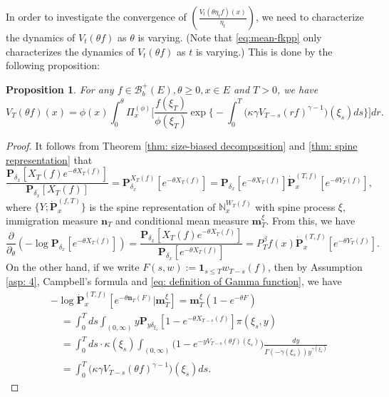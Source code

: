 \documentclass[12pt, a4paper]{amsart}
\newtheorem{prop}[thm]{Proposition}
\theoremstyle{definition}
\numberwithin{equation}{section}
\begin{document}
	In order to investigate the convergence of $(\frac{ V_t(\theta \eta_t f)(x)}{\eta_t})$, we need to characterize the dynamics of $V_t(\theta f)$ as $\theta$ is varying.
	(Note that \eqref{eq:mean-fkpp} only characterizes the dynamics of $V_t(\theta f)$ as $t$ is varying.)
	This is done by the following proposition:

\begin{prop}
	For any $f\in \mathscr B^+_b(E),\theta \geq 0,x\in E$ and $T>0$, we have
\[\label{eq: equation for Vt(theta f) for theta}
	V_T ( \theta f) ( x)
	= \phi( x) \int_0^\theta \Pi_x^{(\phi)} \Big[ \frac{ f(\xi_T) } { \phi(\xi_T) } \exp\Big\{ - \int_0^T \big( \kappa \gamma V_{T-s} (r f)^{ \gamma - 1} \big) ( \xi_s) ds\Big\} \Big] dr.
\]
\end{prop}

\begin{proof}
	It follows from Theorem \ref{thm: size-biased decomposition} and \ref{thm: spine representation} that
\[
	\frac{ \mathbf P_{\delta_x}[X_T(f)e^{-\theta X_T(f)}] } {  \mathbf P_{\delta_x} [X_T(f)] }
	= \mathbf P_{\delta_x}^{X_T(f)} [e^{-\theta X_T(f)}]
	= \mathbf P_{\delta_x} [e^{-\theta X_T(f)}] \dot {\mathbf P}_x^{(T,f)}[e^{-\theta Y_T(f)}],
\]
	where $\{Y; \dot {\mathbf P}^{(f,T)}_x\}$ is the spine representation of $\mathbb N^{W_T(f)}_x$ with spine process $\xi$,
immigration measure
	$\mathbf n_T$ and
conditional mean measure
	$\mathbf m^\xi_T$.
	From this, we have
\[ \label{eq: dynamic of theta on v_t theta reason 1}
	\frac{\partial}{\partial_\theta}
	(-\log \mathbf P_{\delta_x}[e^{-\theta X_T(f)}])
	= \frac{\mathbf P_{\delta_x}[X_T(f)e^{-\theta X_T(f)}]}{\mathbf P_{\delta_x}[e^{-\theta X_T(f)}]}
	= P^\beta_T f(x) \dot {\mathbf P}_x^{(T,f)}[e^{-\theta Y_T(f)}].
\]
	On the other hand, if we write $F(s,w):= \mathbf 1_{s\leq T} w_{T-s}(f)$,
	then by Assumption \ref{asp: 4}, Campbell's formula and \eqref{eq: definition of Gamma function}, we have
\[\label{eq: dynamic of theta on v_t theta reason 2}\begin{split}
	&-\log \dot {\mathbf P}^{(T,f)}_{x}[e^{-\theta \mathbf n_T(F)}|\mathbf m_T^\xi]
	= \mathbf m_T^\xi(1-e^{-\theta F})
	\\&\quad = \int_0^T ds \int_{(0,\infty)} y \mathbf P_{y\delta_{\xi_s}}[1- e^{-\theta X_{T-s}(f)}] \pi(\xi_s,y)
	\\&\quad = \int_0^T ds \cdot \kappa(\xi_s) \int_{(0,\infty)} \mathbf (1- e^{- y V_{T-s}(\theta f)(\xi_s)}) \frac{dy}{\Gamma(-\gamma(\xi_s)) y^{\gamma(\xi_s)}}
	\\&\quad = \int_0^T \big(\kappa\gamma V_{T-s}(\theta f)^{\gamma-1}\big)(\xi_s) ds.

\end{split}\]
\end{proof}
\end{document}
